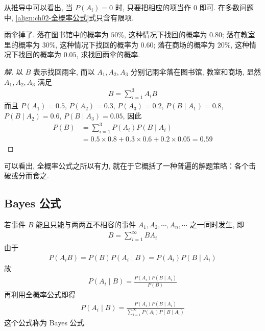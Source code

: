 \documentclass[../../main.tex]{subfiles}
\begin{document}
从推导中可以看出, 当 $P(A_i)=0$ 时, 只要把相应的项当作 $0$ 即可. 在多数问题中, \eqref{align:ch02-全概率公式}式只含有限项.

\begin{example}[找回雨伞]\label{example:ch02-找回雨伞}
雨伞掉了. 落在图书馆中的概率为 $50\%$, 这种情况下找回的概率为 $0.80$; 落在教室里的概率为 $30\%$, 这种情况下找回的概率为 $0.60$; 落在商场的概率为 $20\%$, 这种情况下找回的概率为 $0.05$, 求找回雨伞的概率.

\begin{proof}[解]
以 $B$ 表示找回雨伞, 而以 $A_1, A_2, A_3$ 分别记雨伞落在图书馆, 教室和商场, 显然 $A_1, A_2, A_3$ 满足
\begin{align*}
B=\sum_{i=1}^{3} A_iB
\end{align*}
而且 $P(A_1)=0.5$, $P(A_2)=0.3$, $P(A_3)=0.2$, $P(B\mid A_1)=0.8$, $P(B\mid A_2)=0.6$, $P(B\mid A_3)=0.05$, 因此
\begin{align*}
P(B)&=\sum_{i=1}^{3} P(A_i)P(B\mid A_i)\\
&=0.5\times 0.8+0.3\times 0.6+0.2\times 0.05=0.59
\end{align*}
\end{proof}

可以看出, 全概率公式之所以有力, 就在于它概括了一种普遍的解题策略：各个击破或分而食之.
\end{example}

\subsection{Bayes 公式}

若事件 $B$ 能且只能与两两互不相容的事件 $A_1, A_2, \cdots, A_n, \cdots$ 之一同时发生, 即
\begin{align*}
B=\sum_{i=1}^{\infty} BA_i
\end{align*}
由于
\begin{align*}
P(A_iB)=P(B)P(A_i\mid B)=P(A_i)P(B\mid A_i)
\end{align*}
故
\begin{align*}
P(A_i\mid B)=\frac{P(A_i)P(B\mid A_i)}{P(B)}
\end{align*}
再利用全概率公式即得
\begin{align}\label{align:ch02-Bayes公式}
P(A_i\mid B)=\frac{P(A_i)P(B\mid A_i)}{\sum_{i=1}^{\infty} P(A_i)P(B\mid A_i)}
\end{align}
这个公式称为 Bayes 公式.
\end{document}
